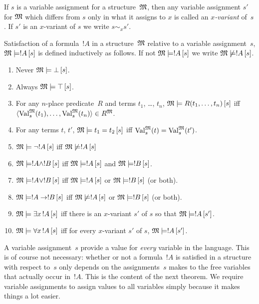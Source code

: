 \documentclass[open-logic-section]{subfiles}
\begin{document}
\begin{defn}[$x$-Variant]
If $s$ is a variable assignment for a structure~$\mathfrak M$, then any
variable assignment $s'$ for $\mathfrak M$ which differs from $s$ only
in what it assigns to $x$ is called an \emph{$x$-variant} of~$s$.  If
$s'$ is an $x$-variant of $s$ we write $s \sim_x s'$.
\end{defn}

\begin{defn}[Satisfaction]
Satisfaction of a formula~$!A$ in a structure~$\mathfrak M$ relative to
a variable assignment~$s$, $\Sat{M}{!A}[s]$ is defined inductively as
follows. If not $\Sat{M}{!A}[s]$ we write $\Sat/{M}{!A}[s]$.
\begin{enumerate}
\item Never $\Sat{M}{\lfalse}[s]$.
\item Always $\Sat{M}{\ltrue}[s]$.
\item For any $n$-place predicate~$R$ and terms $t_1$, \dots, $t_n$,
  $\Sat{M}{\Atom{R}{t_1, \dots, t_n}}[s]$ iff $\langle \Value{t_1}{M}[s],
  \dots, \Value{t_n}{M}[s] \rangle \in \Assign{R}{M}$.
\item For any terms $t$, $t'$, $\Sat{M}{\leq[t_1][t_2]}[s]$ iff
  $\Value{t}{M}[s] = \Value{t'}{M}[s]$.
\item $\Sat{M}{\lnot !A}[s]$ iff $\Sat/{M}{!A}[s]$
\item $\Sat{M}{!A \land !B}[s]$ iff $\Sat{M}{!A}[s]$ and $\Sat{M}{!B}[s]$.
\item $\Sat{M}{!A \lor !B}[s]$ iff $\Sat{M}{!A}[s]$ or
  $\Sat{M}{!B}[s]$ (or both).
\item $\Sat{M}{!A \lif !B}[s]$ iff $\Sat/{M}{!A}[s]$ or
  $\Sat{M}{!B}[s]$ (or both).
\item $\Sat{M}{\lexists[x][!A]}[s]$ iff there is an $x$-variant $s'$
  of $s$ so that $\Sat{M}{!A}[s']$.
\item $\Sat{M}{\lforall[x][!A]}[s]$ iff for every $x$-variant $s'$ of
  $s$, $\Sat{M}{!A}[s']$.
\end{enumerate}
\end{defn}

\begin{wordy}
A variable assignment~$s$ provide a value for \emph{every} variable in
the language. This is of course not necessary: whether or not a
formula~$!A$ is satisfied in a structure with respect to~$s$ only
depends on the assignments~$s$ makes to the free variables that
actually occur in~$!A$.  This is the content of the next theorem.  We
require variable assignments to assign values to all variables simply
because it makes things a lot easier.
\end{wordy}
\end{document}
